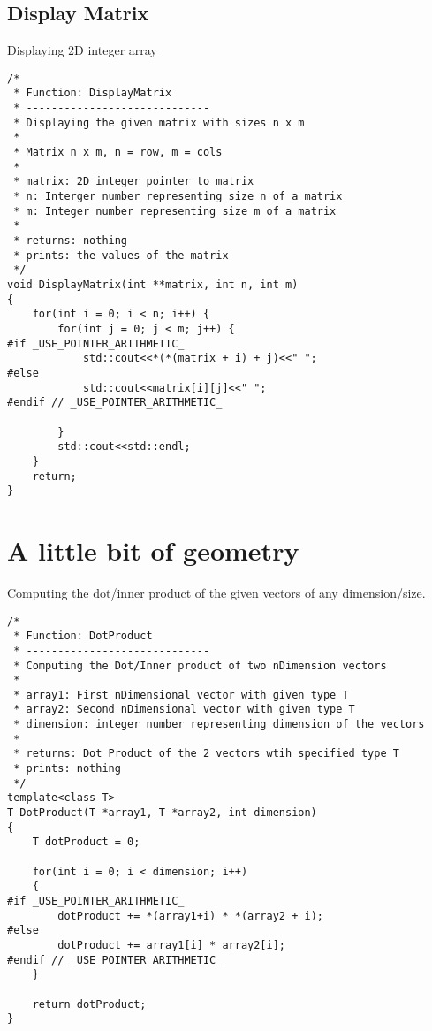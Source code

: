 \documentclass{article}
\begin{document}
	\subsection{Display Matrix}
		Displaying 2D integer array
		\begin{lstlisting}[label=lab3.8.4,caption=2D Matrix Display]
/*
 * Function: DisplayMatrix
 * -----------------------------
 * Displaying the given matrix with sizes n x m
 *
 * Matrix n x m, n = row, m = cols
 *
 * matrix: 2D integer pointer to matrix
 * n: Interger number representing size n of a matrix
 * m: Integer number representing size m of a matrix
 *
 * returns: nothing
 * prints: the values of the matrix
 */
void DisplayMatrix(int **matrix, int n, int m)
{
    for(int i = 0; i < n; i++) {
        for(int j = 0; j < m; j++) {
#if _USE_POINTER_ARITHMETIC_
            std::cout<<*(*(matrix + i) + j)<<" ";
#else
            std::cout<<matrix[i][j]<<" ";
#endif // _USE_POINTER_ARITHMETIC_

        }
        std::cout<<std::endl;
    }
    return;
}
		\end{lstlisting}	




\section{A little bit of geometry}

Computing the dot/inner product of the given vectors of any dimension/size.

\begin{lstlisting}[label=lab3.9,caption=Dot Product]
/*
 * Function: DotProduct
 * -----------------------------
 * Computing the Dot/Inner product of two nDimension vectors
 *
 * array1: First nDimensional vector with given type T
 * array2: Second nDimensional vector with given type T
 * dimension: integer number representing dimension of the vectors
 *
 * returns: Dot Product of the 2 vectors wtih specified type T
 * prints: nothing
 */
template<class T>
T DotProduct(T *array1, T *array2, int dimension)
{
    T dotProduct = 0;

    for(int i = 0; i < dimension; i++)
    {
#if _USE_POINTER_ARITHMETIC_
        dotProduct += *(array1+i) * *(array2 + i);
#else
        dotProduct += array1[i] * array2[i];
#endif // _USE_POINTER_ARITHMETIC_
    }

    return dotProduct;
}
\end{lstlisting}	
\end{document}
